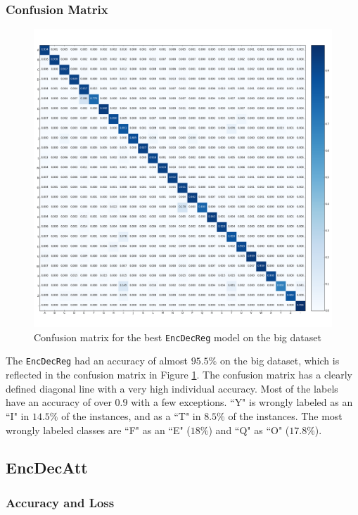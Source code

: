 \subsubsection{Confusion Matrix}
\begin{figure}[H]
    \centering
    \includegraphics[width=1\textwidth]{fig/results/experiment1/big/encdecreg/confusion_matrix.png}
    \caption{Confusion matrix for the best {\tt EncDecReg} model on the big dataset}
    \label{fig:result1_big_encdecreg_confusion_matrix}
\end{figure}

The {\tt EncDecReg} had an accuracy of almost \(95.5\%\) on the big dataset, which is reflected in the confusion matrix in Figure \ref{fig:result1_big_encdecreg_confusion_matrix}. The confusion matrix has a clearly defined diagonal line with a very high individual accuracy. Most of the labels have an accuracy of over \(0.9\) with a few exceptions. ``Y" is wrongly labeled as an ``I" in \(14.5\%\) of the instances, and as a ``T" in \(8.5\%\) of the instances. The most wrongly labeled classes are ``F" as an ``E" (\(18\%\)) and ``Q" as ``O"  (\(17.8\%\)).

\subsection{EncDecAtt}
\subsubsection{Accuracy and Loss}

